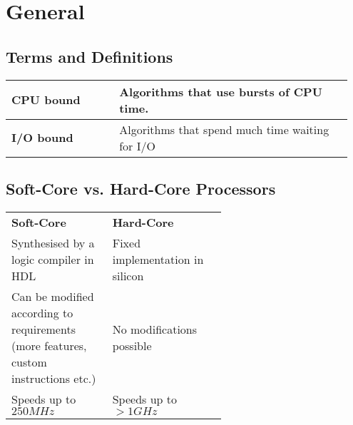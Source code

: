 \section{General}
	\subsection{Terms and Definitions}
		\begin{table}[H]
			\centering
			\begin{tabular}{|p{0.3\linewidth}|p{0.65\linewidth}|}
				 \hline
				 \textbf{CPU bound} 
				 	& Algorithms that use bursts of CPU time.\\
				 \hline
				 \textbf{I/O bound}  
				 	& Algorithms that spend much time waiting for I/O\\
				 \hline		
			\end{tabular}
		\end{table}
		
	\subsection{Soft-Core vs. Hard-Core Processors}
	
		\begin{table}[H]
			\centering
			\begin{tabular}{|p{0.3\linewidth}|p{0.3\linewidth}|}
				 \hline
				 \textbf{Soft-Core} 
				 	& \textbf{Hard-Core}\\
				 \hhline{|=|=|}
				 Synthesised by a logic compiler in HDL  
				 	& Fixed implementation in silicon\\
				 \hline
				 Can be modified according to requirements (more features, custom
				 instructions etc.)
				 	& No modifications possible\\
				 \hline
				 Speeds up to $250MHz$
				 	& Speeds up to $>1GHz$\\
				 \hline			
			\end{tabular}
		\end{table}
		
	